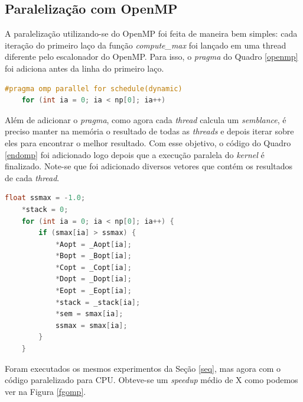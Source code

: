 \documentclass[12pt]{article}
\begin{document}
\subsection{Paralelização com OpenMP} \label{omp}

A paralelização utilizando-se do OpenMP foi feita de maneira bem simples: cada iteração do primeiro laço da função \textit{compute\_max} foi lançado em uma thread diferente pelo escalonador do OpenMP. Para isso, o \textit{pragma} do Quadro \ref{openmp} foi adiciona antes da linha do primeiro laço.
\\
\begin{lstlisting}[language=c, caption=\textit{Pragma} para paralelização com OpenMP., label=openmp]
    #pragma omp parallel for schedule(dynamic)
    for (int ia = 0; ia < np[0]; ia++) 
\end{lstlisting}

Além de adicionar o \textit{pragma}, como agora cada \textit{thread} calcula um \textit{semblance}, é preciso manter na memória o resultado de todas as \textit{threads} e depois iterar sobre eles para encontrar o melhor resultado. Com esse objetivo, o código do Quadro \ref{endomp} foi adicionado logo depois que a execução paralela do \textit{kernel} é finalizado. Note-se que foi adicionado diversos vetores que contém os resultados de cada \textit{thread}. \\

\begin{lstlisting}[language=c, caption=Código para selecionar o melhor resultado entre os resultados calculados por cada \textit{thread}., label=endomp]
    float ssmax = -1.0;
    *stack = 0;
    for (int ia = 0; ia < np[0]; ia++) {
        if (smax[ia] > ssmax) {
            *Aopt = _Aopt[ia];
            *Bopt = _Bopt[ia];
            *Copt = _Copt[ia];
            *Dopt = _Dopt[ia];
            *Eopt = _Eopt[ia];
            *stack = _stack[ia];
            *sem = smax[ia];
            ssmax = smax[ia];
        }
    }
\end{lstlisting}

Foram executados os mesmos experimentos da Seção \ref{seq}, mas agora com o código paralelizado para CPU. Obteve-se um \textit{speedup} médio de X como podemos ver na Figura \ref{fgomp}.
\end{document}
